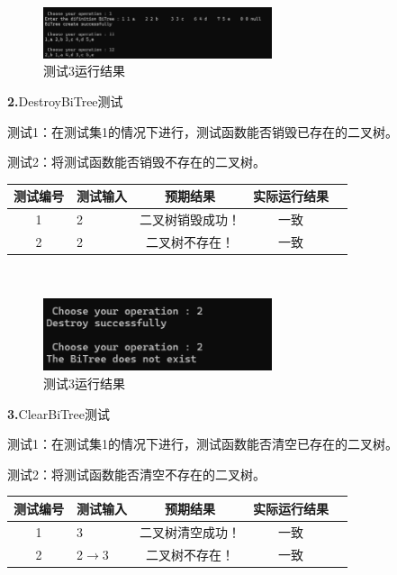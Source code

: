 \documentclass[supercite]{Experimental_Report}
\theoremstyle{definition}
\begin{document}
~\

 \begin{figure}[H]
 	\centering
 	\includegraphics[width=0.6\textwidth]{images/二叉树测试1.png}
 	\caption{测试3运行结果}
 	\label{txlab}
 \end{figure}

\noindent\textbf{ 2.}DestroyBiTree测试

测试1：在测试集1的情况下进行，测试函数能否销毁已存在的二叉树。

测试2：将测试函数能否销毁不存在的二叉树。

\vspace{0.5em}

\begin{tabular}{|c|l|c|c|c|}
	\hline
	测试编号 & 测试输入 & 预期结果 & 实际运行结果 \\
	\hline
	1 & 2 & 二叉树销毁成功！ & 一致 \\
	\hline
	2 & 2 & 二叉树不存在！& 一致 \\
	\hline
\end{tabular}

~\

\begin{figure}[H]
 	\centering
 	\includegraphics[width=0.6\textwidth]{images/二叉树测试2.png}
 	\caption{测试3运行结果}
 	\label{txlab}
 \end{figure}

\noindent\textbf{ 3.}ClearBiTree测试

测试1：在测试集1的情况下进行，测试函数能否清空已存在的二叉树。

测试2：将测试函数能否清空不存在的二叉树。

\vspace{0.5em}

\begin{tabular}{|c|l|c|c|c|}
	\hline
	测试编号 & 测试输入 & 预期结果 & 实际运行结果 \\
	\hline
	1 & 3 & 二叉树清空成功！ & 一致 \\
	\hline
	2 & 2$\rightarrow$3 & 二叉树不存在！ & 一致 \\
	\hline
\end{tabular}
\end{document}
